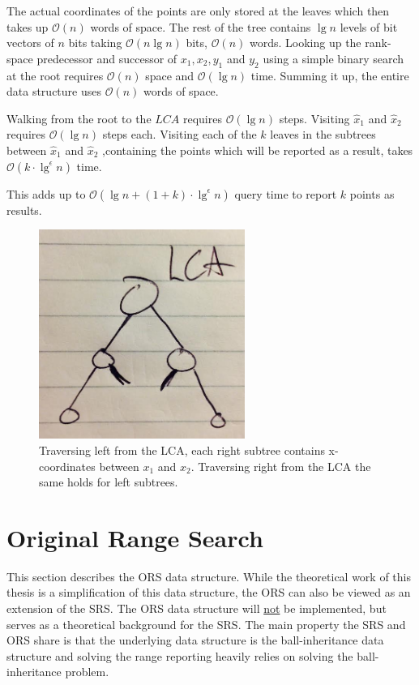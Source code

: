 The actual coordinates of the points are only stored at the leaves which then takes up $\mathcal{O}(n)$  words of space. The rest of the tree contains $\lg n$ levels of bit vectors of $n$ bits taking $\mathcal{O}(n \lg n)$ bits, $\mathcal{O}(n)$ words. Looking up the rank-space predecessor and successor of $x_1, x_2, y_1$ and $y_2$ using a simple binary search at the root requires $\mathcal{O}(n)$ space and $\mathcal{O}(\lg n)$ time. Summing it up, the entire data structure uses $\mathcal{O}(n)$ words of space. 

Walking from the root to the $LCA$ requires $\mathcal{O}(\lg n)$ steps. Visiting $\hat{x}_1$ and $\hat{x}_2$ requires $\mathcal{O}(\lg n)$ steps each. Visiting each of the $k$ leaves in the subtrees between $\hat{x}_1$ and $\hat{x}_2$ ,containing the points which will be reported as a result, takes $\mathcal{O}(k \cdot \lg^\epsilon n)$ time.

This adds up to $\mathcal{O}(\lg n + (1+k)\cdot\lg^\epsilon n)$ query time to report $k$ points as results. 

\begin{figure}[H]
    \centering
    \includegraphics[width=0.6\textwidth]{pictures/LCA.png}
    \caption{Traversing left from the LCA, each right subtree contains x-coordinates between $x_1$ and $x_2$. Traversing right from the LCA the same holds for left subtrees.}
    \label{fig:LCA}
\end{figure}


\section{Original Range Search}
\label{sect:original}

This section describes the ORS data structure. While the theoretical work of this thesis is a simplification of this data structure, the ORS can also be viewed as an extension of the SRS. The ORS data structure will \underline{not} be implemented, but serves as a theoretical background for the SRS. The main property the SRS and ORS share is that the underlying data structure is the ball-inheritance data structure and solving the range reporting heavily relies on solving the ball-inheritance problem.

